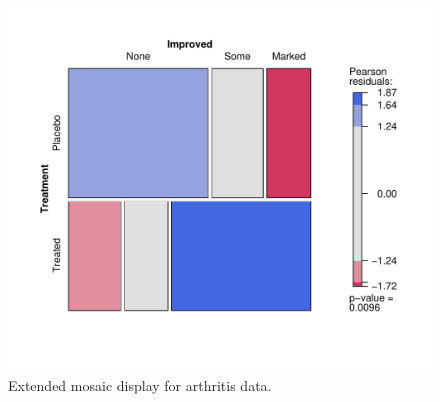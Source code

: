 \documentclass{Z}
\begin{document}
\begin{figure}[p]
\begin{center}
\includegraphics{hcl-colors-arthritis1}
\caption{\label{fig:arthritis} Extended mosaic display for arthritis data.}
\end{center}
\end{figure}
\end{document}
